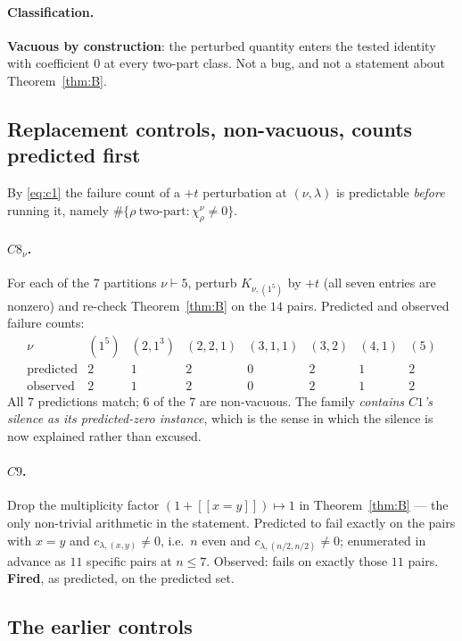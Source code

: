 \documentclass[11pt]{article}
\theoremstyle{plain}
\theoremstyle{definition}
\newcommand{\lam}{\lambda}
\newcommand{\lb}{[\![}
\newcommand{\rb}{]\!]}
\begin{document}
\paragraph{Classification.} \textbf{Vacuous by construction}: the perturbed quantity enters the
tested identity with coefficient $0$ at every two-part class. Not a bug, and not a statement about
Theorem~\ref{thm:B}.

\subsection{Replacement controls, non-vacuous, counts predicted first}

By \eqref{eq:c1} the failure count of a $+t$ perturbation at $(\nu,\lam)$ is predictable
\emph{before} running it, namely $\#\{\rho\ \text{two-part}:\chi^{\nu}_{\rho}\neq 0\}$.

\paragraph{$C8_\nu$.} For each of the $7$ partitions $\nu\vdash 5$, perturb $K_{\nu,(1^5)}$ by
$+t$ (all seven entries are nonzero) and re-check Theorem~\ref{thm:B} on the $14$ pairs.
Predicted and observed failure counts:
\[
\begin{array}{lccccccc}
\nu & (1^5) & (2,1^3) & (2,2,1) & (3,1,1) & (3,2) & (4,1) & (5)\\
\hline
\text{predicted} & 2 & 1 & 2 & 0 & 2 & 1 & 2\\
\text{observed}  & 2 & 1 & 2 & 0 & 2 & 1 & 2
\end{array}
\]
All $7$ predictions match; $6$ of the $7$ are non-vacuous. The family \emph{contains $C1$'s
silence as its predicted-zero instance}, which is the sense in which the silence is now explained
rather than excused.

\paragraph{$C9$.} Drop the multiplicity factor $(1+\lb x=y\rb)\mapsto 1$ in
Theorem~\ref{thm:B} --- the only non-trivial arithmetic in the statement. Predicted to fail
exactly on the pairs with $x=y$ and $c_{\lam,(x,y)}\neq 0$, i.e.\ $n$ even and
$c_{\lam,(n/2,n/2)}\neq 0$; enumerated in advance as $11$ specific pairs at $n\le 7$. Observed:
fails on exactly those $11$ pairs. \textbf{Fired}, as predicted, on the predicted set.

\subsection{The earlier controls}
\end{document}
